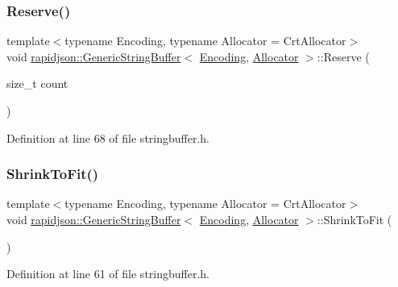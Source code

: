 \subsubsection{\texorpdfstring{Reserve()}{Reserve()}}
{\footnotesize\ttfamily template$<$typename Encoding, typename Allocator = Crt\+Allocator$>$ \\
void \mbox{\hyperlink{classrapidjson_1_1_generic_string_buffer}{rapidjson\+::\+Generic\+String\+Buffer}}$<$ \mbox{\hyperlink{classrapidjson_1_1_encoding}{Encoding}}, \mbox{\hyperlink{classrapidjson_1_1_allocator}{Allocator}} $>$\+::Reserve (\begin{DoxyParamCaption}\item[{size\+\_\+t}]{count }\end{DoxyParamCaption})}



Definition at line 68 of file stringbuffer.\+h.


\begin{DoxyCode}{0}

\end{DoxyCode}
\mbox{\label{classrapidjson_1_1_generic_string_buffer_a7e688f68b88820655f717d3cc352b842}} 
\subsubsection{\texorpdfstring{ShrinkToFit()}{ShrinkToFit()}}
{\footnotesize\ttfamily template$<$typename Encoding, typename Allocator = Crt\+Allocator$>$ \\
void \mbox{\hyperlink{classrapidjson_1_1_generic_string_buffer}{rapidjson\+::\+Generic\+String\+Buffer}}$<$ \mbox{\hyperlink{classrapidjson_1_1_encoding}{Encoding}}, \mbox{\hyperlink{classrapidjson_1_1_allocator}{Allocator}} $>$\+::Shrink\+To\+Fit (\begin{DoxyParamCaption}{ }\end{DoxyParamCaption})}



Definition at line 61 of file stringbuffer.\+h.


